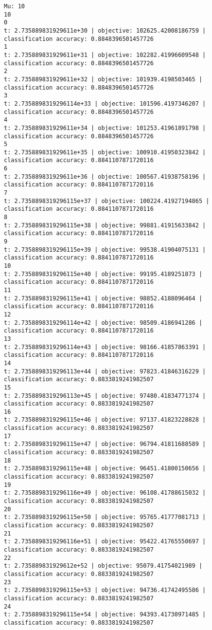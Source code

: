\documentclass[11pt]{article}
\theoremstyle{remark}
\begin{document}
\begin{itemize}
\begin{verbatim}
Mu: 10
10
0
t: 2.735889831929611e+30 | objective: 102625.42008186759 | classification accuracy: 0.8848396501457726
1
t: 2.735889831929611e+31 | objective: 102282.41996609548 | classification accuracy: 0.8848396501457726
2
t: 2.735889831929611e+32 | objective: 101939.4198503465 | classification accuracy: 0.8848396501457726
3
t: 2.7358898319296114e+33 | objective: 101596.4197346207 | classification accuracy: 0.8848396501457726
4
t: 2.735889831929611e+34 | objective: 101253.41961891798 | classification accuracy: 0.8848396501457726
5
t: 2.735889831929611e+35 | objective: 100910.41950323842 | classification accuracy: 0.8841107871720116
6
t: 2.735889831929611e+36 | objective: 100567.41938758196 | classification accuracy: 0.8841107871720116
7
t: 2.7358898319296115e+37 | objective: 100224.41927194865 | classification accuracy: 0.8841107871720116
8
t: 2.7358898319296115e+38 | objective: 99881.41915633842 | classification accuracy: 0.8841107871720116
9
t: 2.7358898319296115e+39 | objective: 99538.41904075131 | classification accuracy: 0.8841107871720116
10
t: 2.7358898319296115e+40 | objective: 99195.4189251873 | classification accuracy: 0.8841107871720116
11
t: 2.7358898319296115e+41 | objective: 98852.4188096464 | classification accuracy: 0.8841107871720116
12
t: 2.7358898319296114e+42 | objective: 98509.4186941286 | classification accuracy: 0.8841107871720116
13
t: 2.7358898319296114e+43 | objective: 98166.41857863391 | classification accuracy: 0.8841107871720116
14
t: 2.7358898319296113e+44 | objective: 97823.41846316229 | classification accuracy: 0.8833819241982507
15
t: 2.7358898319296113e+45 | objective: 97480.41834771374 | classification accuracy: 0.8833819241982507
16
t: 2.7358898319296115e+46 | objective: 97137.41823228828 | classification accuracy: 0.8833819241982507
17
t: 2.7358898319296115e+47 | objective: 96794.41811688589 | classification accuracy: 0.8833819241982507
18
t: 2.7358898319296115e+48 | objective: 96451.41800150656 | classification accuracy: 0.8833819241982507
19
t: 2.7358898319296116e+49 | objective: 96108.41788615032 | classification accuracy: 0.8833819241982507
20
t: 2.7358898319296115e+50 | objective: 95765.41777081713 | classification accuracy: 0.8833819241982507
21
t: 2.7358898319296116e+51 | objective: 95422.41765550697 | classification accuracy: 0.8833819241982507
22
t: 2.735889831929612e+52 | objective: 95079.41754021989 | classification accuracy: 0.8833819241982507
23
t: 2.7358898319296115e+53 | objective: 94736.41742495586 | classification accuracy: 0.8833819241982507
24
t: 2.7358898319296115e+54 | objective: 94393.41730971485 | classification accuracy: 0.8833819241982507
\end{verbatim}
\end{itemize}
\color{black}
\end{document}
